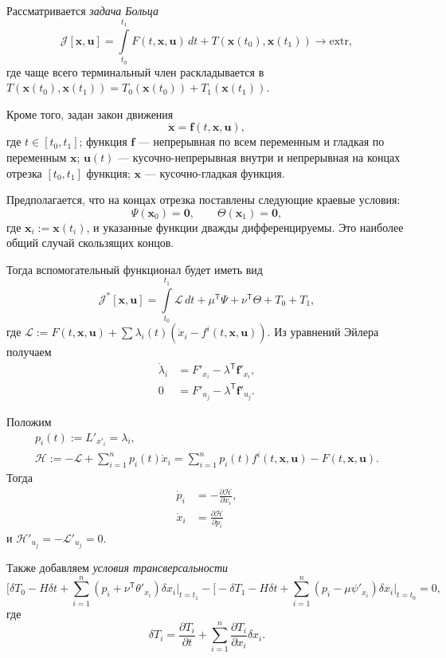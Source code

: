 Рассматривается \emph{задача Больца} 
\[
  \mathscr{J}[\mathbf{x}, \mathbf{u}] = \int\limits_{t_0}^{t_1}F(t,
  \mathbf{x}, \mathbf{u})\,dt + T(\mathbf{x}(t_0), \mathbf{x}(t_1))
  \to \mathrm{extr},
\]
где чаще всего терминальный член раскладывается в $ T(\mathbf{x}(t_0),
\mathbf{x}(t_1)) = T_0(\mathbf{x}(t_0)) + T_1(\mathbf{x}(t_1)) $. 

Кроме того, задан закон движения  
\[
  \dot{\mathbf{x}} = \mathbf{f}(t, \mathbf{x}, \mathbf{u}),
\]
где $ t \in [t_0, t_1] $; функция $ \mathbf{f} $ --- непрерывная по всем
переменным и гладкая по переменным
$ \mathbf{x} $; $ \mathbf{u}(t) $ --- кусочно-непрерывная внутри и непрерывная на
концах отрезка $ [t_0, t_1] $ функция; $ \mathbf{x} $ --- кусочно-гладкая
функция. 

Предполагается, что на концах отрезка поставлены следующие краевые условия: 
\[
  \Psi(\mathbf{x}_0) = \mathbf{0}, \qquad \Theta(\mathbf{x}_1) = \mathbf{0},
\]
где $ \mathbf{x}_i := \mathbf{x}(t_i) $, и указанные функции дважды
дифференцируемы. Это наиболее общий случай скользящих концов.

Тогда вспомогательный функционал будет иметь вид 
\[
  \mathscr{J}^\ast[\mathbf{x}, \mathbf{u}] = \int\limits_{t_0}^{t_1}
  \mathscr{L}\,dt  + \mu^{\mathsf{T}}\Psi + \nu^{\mathsf{T}}\Theta + T_0 + T_1,
\]
где $ \mathscr{L} := F(t, \mathbf{x}, \mathbf{u}) +
\sum\lambda_i(t)(\dot{x}_i - f^i(t, \mathbf{x}, \mathbf{u})) $. Из уравнений
Эйлера получаем 
\begin{align*}
  \dot\lambda_i &= F'_{x_i} - \lambda^{\mathsf T} \mathbf{f}'_{x_i}, \\
  0 &= F'_{u_j} - \lambda^{\mathsf T} \mathbf{f}'_{u_j}.
\end{align*}

Положим
\begin{gather*}
  p_i(t) := L'_{x'_i} = \lambda_i, \\
  \mathscr{H} := - \mathscr{L} + \sum_{i=1}^n
  p_i(t)\dot{x}_i = \sum_{i=1}^n p_i(t) f^i(t, \mathbf{x}, \mathbf{u}) - F(t,
  \mathbf{x}, \mathbf{u}).
\end{gather*}
Тогда  
\begin{align*}
  \dot{p}_i &= - \frac{\partial \mathscr H}{\partial x_i},\\
  \dot{x}_i &= \frac{\partial \mathscr H}{\partial p_i}
\end{align*}
и $ \mathscr{H}'_{u_j} = - \mathscr{L}'_{u_j} = 0 $.


Также добавляем \emph{условия трансверсальности} 
\[
  \biggl[\delta T_0 - H\delta t + \sum_{i=1}^n (p_i+\nu^{\mathsf
    T}\theta'_{x_i})\delta
    x_i\biggr|_{t=t_1}\!\!\! -
    \biggl[ - \delta T_1 - H\delta t + \sum_{i=1}^n (p_i-\mu\psi'_{x_i})\delta x_i
      \biggr|_{t=t_0} \!\!\! = 0,
\]
где  
\[
  \delta T_i = \frac{\partial T_i}{\partial t} + \sum_{i=1}^n \frac{\partial
  T_i}{\partial x_i}\delta x_i.
\]

